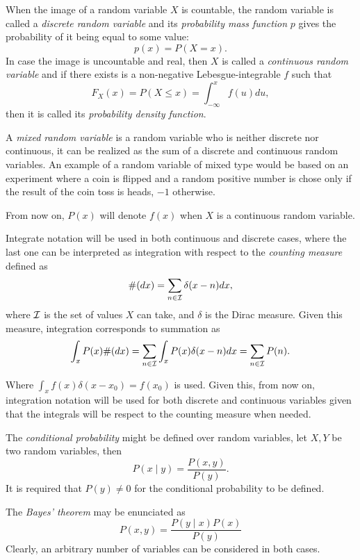 \begin{definition}
When the image of a random variable \(X\) is countable, the random variable
is called a
\emph{discrete random variable} and its \emph{probability mass function} \(p\) gives the
probability of it being equal to some value:
\[
p(x) = P(X = x).
\]
In case the image is uncountable and real, then \(X\) is called a \emph{continuous random
  variable} and if there exists is a non-negative
Lebesgue-integrable \(f\) such that
\[
F_X(x) = P(X \leq x) = \int_{-\infty}^x f(u) du,
\]
then it is called its \emph{probability density function}.

A \emph{mixed random variable} is a random variable who is neither discrete nor
continuous, it can be realized as the sum of a discrete and continuous random
variables. An example of a random variable of mixed type would be based on an
experiment where a coin is flipped and a random positive number is chose only if
the result of the coin toss is heads, $-1$ otherwise.
\end{definition}

From now on, \(P(x)\) will denote \(f(x)\) when \(X\) is a continuous random
variable.

Integrate notation will be used in both continuous and discrete cases, where the last one can be interpreted as integration with respect to the \emph{counting measure} defined as
\[
 \#(dx) = \sum_{n \in \mathcal{I}}\delta(x - n)dx,
\]
where \(\mathcal{I}\) is the set of values \(X\) can take, and \(\delta\) is the Dirac measure. Given this measure, integration corresponds to summation as
\[
  \int_{x} P(x) \#(dx) = \sum_{n \in \mathcal{I}}\int_{x} P(x) \delta(x-n) dx = \sum_{n \in \mathcal{I}}P(n).
\]

Where \(\int_{x} f(x)\delta(x - x_{0}) = f(x_{0})\) is used. Given this, from now on, integration notation will be used for both discrete and continuous variables given that the integrals will be respect to the counting measure when needed.

\begin{definition}
  The \emph{conditional probability} might be defined over
  random variables, let \(X, Y\) be two random variables, then
  \[
    P(x \mid y) = \frac{P(x,y)}{P(y)}.
  \]
  It is  required that \(P(y) \neq 0\) for the conditional probability to be defined.
\end{definition}

The \emph{Bayes' theorem} may be enunciated as
\[
  P(x,y) = \frac{P(y\mid x)P(x)}{P(y)}
\]
Clearly, an arbitrary number of variables can be considered in both cases.

